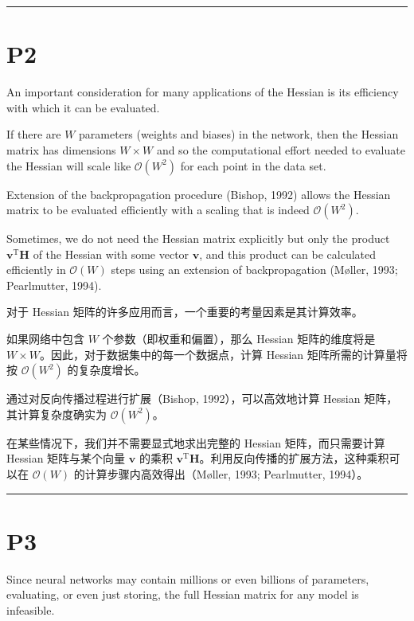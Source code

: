 \documentclass{article}
\begin{document}
\noindent\rule{\linewidth}{0.4pt}

\section{P2}

An important consideration for many applications of the Hessian is its efficiency with which it can be evaluated. 

If there are $W$ parameters (weights and biases) in the network, then the Hessian matrix has dimensions $W \times W$ and so the computational effort needed to evaluate the Hessian will scale like $\mathcal{O}(W^2)$ for each point in the data set. 

Extension of the backpropagation procedure (Bishop, 1992) allows the Hessian matrix to be evaluated efficiently with a scaling that is indeed $\mathcal{O}(W^2)$. 

Sometimes, we do not need the Hessian matrix explicitly but only the product $\mathbf{v}^\mathrm{T} \mathbf{H}$ of the Hessian with some vector $\mathbf{v}$, and this product can be calculated efficiently in $\mathcal{O}(W)$ steps using an extension of backpropagation (Møller, 1993; Pearlmutter, 1994).

{\color{red}
对于 Hessian 矩阵的许多应用而言，一个重要的考量因素是其计算效率。

如果网络中包含 $W$ 个参数（即权重和偏置），那么 Hessian 矩阵的维度将是 $W \times W$。因此，对于数据集中的每一个数据点，计算 Hessian 矩阵所需的计算量将按 $\mathcal{O}(W^2)$ 的复杂度增长。

通过对反向传播过程进行扩展（Bishop, 1992），可以高效地计算 Hessian 矩阵，其计算复杂度确实为 $\mathcal{O}(W^2)$。

在某些情况下，我们并不需要显式地求出完整的 Hessian 矩阵，而只需要计算 Hessian 矩阵与某个向量 $\mathbf{v}$ 的乘积 $\mathbf{v}^\mathrm{T} \mathbf{H}$。利用反向传播的扩展方法，这种乘积可以在 $\mathcal{O}(W)$ 的计算步骤内高效得出（Møller, 1993; Pearlmutter, 1994）。

}

\noindent\rule{\linewidth}{0.4pt}

\section{P3}

Since neural networks may contain millions or even billions of parameters, evaluating, or even just storing, the full Hessian matrix for any model is infeasible. 
\end{document}
